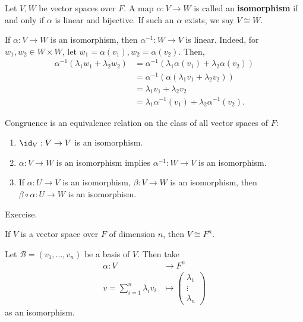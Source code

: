 \documentclass[12pt]{article}
\begin{document}
\begin{definition}[Isomorphism]
	Let $V, W$ be vector spaces over $F$. A map $\alpha : V \to W$ is called an \textbf{isomorphism} if and only if $\alpha$ is linear and bijective. If such an $\alpha$ exists, we say $V \cong W$.
\end{definition}

\begin{remark}
	If $\alpha : V \to W$ is an isomorphism, then $\alpha^{-1} : W \to V$ is linear. Indeed, for $w_1, w_2 \in W \times W$, let $w_1 = \alpha(v_1), w_2 = \alpha(v_2)$. Then,
	\begin{align*}
		\alpha^{-1}(\lambda_1 w_1 + \lambda_2 w_2) &= \alpha^{-1}(\lambda_1 \alpha(v_1) + \lambda_2 \alpha(v_2)) \\
							   &= \alpha^{-1} ( \alpha(\lambda_1 v_1 + \lambda_2 v_2) ) \\
							   &= \lambda_1 v_1 + \lambda_2 v_2 \\
							   &= \lambda_1 \alpha^{-1}(v_1) + \lambda_2 \alpha^{-1}(v_2).
	\end{align*}
\end{remark}

\begin{lemma}
	Congruence is an equivalence relation on the class of all vector spaces of $F$:
	\begin{enumerate}[\normalfont(i)]
		\item $\id_V : V \to V$ is an isomorphism.
		\item $\alpha : V \to W$ is an isomorphism implies $\alpha^{-1} : W \to V$ is an isomorphism.
		\item If $\alpha : U \to V$ is an isomorphism, $\beta : V \to W$ is an isomorphism, then $\beta \circ \alpha : U \to W$ is an isomorphism.
	\end{enumerate}
\end{lemma}

\begin{proofbox}
	Exercise.
\end{proofbox}

\begin{theorem}
	If $V$ is a vector space over $F$ of dimension $n$, then $V \cong F^{n}$.
\end{theorem}

\begin{proofbox}
	Let $\mathcal{B} = (v_1, \ldots, v_n)$ be a basis of $V$. Then take
	\begin{align*}
		\alpha : V &\to F^{n} \\
		v = \sum_{i = 1}^{n} \lambda_i v_i &\mapsto 
		\begin{pmatrix}
			\lambda_1 \\
			\vdots \\
			\lambda_n
		\end{pmatrix}
	\end{align*}
	as an isomorphism.
\end{proofbox}
\end{document}
